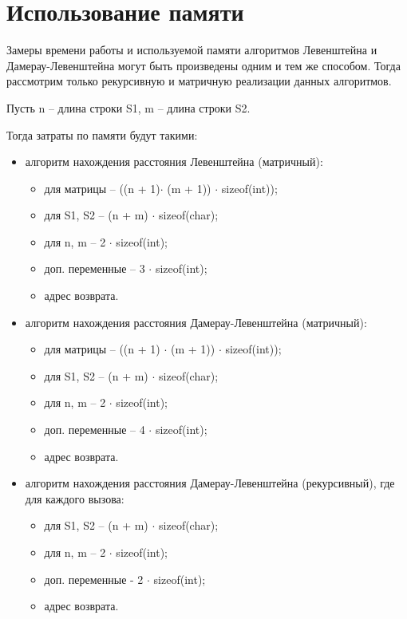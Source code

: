 \clearpage

\section{Использование памяти}

Замеры времени работы и используемой памяти алгоритмов Левенштейна и Дамерау-Левенштейна могут быть произведены одним и тем же способом.
Тогда рассмотрим только рекурсивную и матричную реализации данных алгоритмов.

Пусть n -- длина строки S1, m -- длина строки S2.

Тогда затраты по памяти будут такими:
\begin{itemize}
    \item алгоритм нахождения расстояния Левенштейна (матричный):

    \begin{itemize}
        \item для матрицы -- ((n + 1)$ \cdot$ (m + 1)) $ \cdot$ sizeof(int));
        \item для S1, S2 -- (n + m) $ \cdot$ sizeof(char);
        \item для n, m -- 2 $ \cdot$ sizeof(int);
        \item доп. переменные -- 3 $ \cdot$ sizeof(int);
        \item адрес возврата.
    \end{itemize}

    \item алгоритм нахождения расстояния Дамерау-Левенштейна (матричный):

    \begin{itemize}
        \item для матрицы -- ((n + 1) $ \cdot$ (m + 1)) $ \cdot$ sizeof(int));
        \item для S1, S2 -- (n + m) $ \cdot$ sizeof(char);
        \item для n, m -- 2 $ \cdot$ sizeof(int);
        \item доп. переменные -- 4 $ \cdot$ sizeof(int);
        \item адрес возврата.
    \end{itemize}

    \item алгоритм нахождения расстояния Дамерау-Левенштейна (рекурсивный), где для каждого вызова:

    \begin{itemize}
        \item для S1, S2 -- (n + m) $ \cdot$ sizeof(char);
        \item для n, m -- 2 $ \cdot$ sizeof(int);
        \item доп. переменные - 2 $ \cdot$ sizeof(int);
        \item адрес возврата.
    \end{itemize}


\end{itemize}
